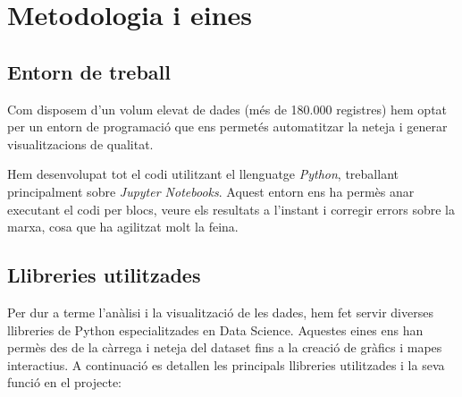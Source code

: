 \documentclass[12pt,a4paper]{article}
\begin{document}
\newpage
\section{Metodologia i eines}

\subsection{Entorn de treball}
Com disposem d'un volum elevat de dades (més de 180.000 registres) hem optat per un entorn de programació que ens permetés automatitzar la neteja i generar visualitzacions de qualitat.

Hem desenvolupat tot el codi utilitzant el llenguatge \textit{Python}, treballant principalment sobre \textit{Jupyter Notebooks}. Aquest entorn ens ha permès anar executant el codi per blocs, veure els resultats a l'instant i corregir errors sobre la marxa, cosa que ha agilitzat molt la feina.
\subsection{Llibreries utilitzades}
Per dur a terme l'anàlisi i la visualització de les dades, hem fet servir diverses llibreries de Python especialitzades en Data Science. Aquestes eines ens han permès des de la càrrega i neteja del dataset fins a la creació de gràfics i mapes interactius. A continuació es detallen les principals llibreries utilitzades i la seva funció en el projecte:
\begin{table}[H]
\centering
\caption{Eines de Python utilitzades en l’anàlisi}
\label{tab:eines_python}
\end{table}
\end{document}
